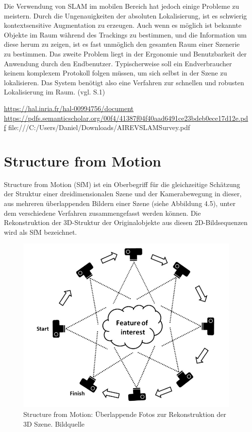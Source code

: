 Die Verwendung von SLAM im mobilen Bereich hat jedoch einige Probleme zu meistern. Durch die Ungenauigkeiten der absoluten Lokalisierung, ist es schwierig kontextsensitive Augmentation zu erzeugen. Auch wenn es möglich ist bekannte Objekte im Raum während des Trackings zu bestimmen, und die Information um diese herum zu zeigen, ist es fast unmöglich den gesamten Raum einer Szenerie zu bestimmen. Das zweite Problem liegt in der Ergonomie und Benutzbarkeit der Anwendung durch den Endbenutzer. Typischerweise soll ein Endverbraucher keinem komplexem Protokoll folgen müssen, um sich selbst in der Szene zu lokalisieren. Das System benötigt also eine Verfahren zur schnellen und robusten Lokalisierung im Raum. (vgl. \cite{slam_mobile} S.1)

\url{https://hal.inria.fr/hal-00994756/document}
\url{https://pdfs.semanticscholar.org/00f4/41387f04f40aad6491ce23bdeb0ece17d12e.pdf}
file:///C:/Users/Daniel/Downloads/AIREVSLAMSurvey.pdf


\section{Structure from Motion}

Structure from Motion (SfM) ist ein Oberbegriff für die gleichzeitige Schätzung der Struktur einer dreidimensionalen Szene und der Kamerabewegung in dieser, aus mehreren überlappenden Bildern einer Szene (siehe Abbildung 4.5), unter dem verschiedene Verfahren zusammengefasst werden können. Die Rekonstruktion der 3D-Struktur der Originalobjekte aus diesen 2D-Bildsequenzen wird als SfM bezeichnet. 

\begin{figure}[H]
	\centering
	\includegraphics[scale=0.5]{sfm.png}
	\caption{Structure from Motion: Überlappende Fotos zur Rekonstruktion der 3D Szene. Bildquelle \cite{sfm_photo}}
\end{figure}  

